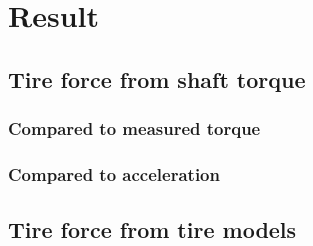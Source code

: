 \chapter{Result}



\section{Tire force from shaft torque}


\subsection{Compared to measured torque}


\subsection{Compared to acceleration}


\section{Tire force from tire models}